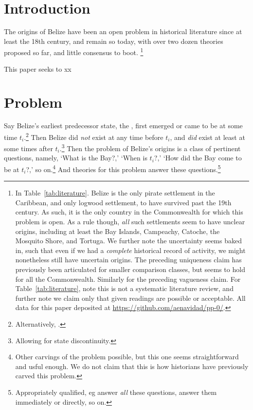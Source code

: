 
%
%
%
\section{Introduction}
\label{s:intro}
	The origins of Belize have been an open problem in historical literature since at least the 18th century, and remain so today, with over two dozen theories proposed so far, and little consensus to boot.%
	\footnote{In Table~\ref{tab:literature}. Belize is the only pirate settlement in the Caribbean, and only logwood settlement, to have survived past the 19th century. As such, it is the only country in the Commonwealth for which this problem is open. As a rule though, \emph{all} such settlements seem to have unclear origins, including at least the Bay Islands, Campeachy, Catoche, the Mosquito Shore, and Tortuga. We further note the uncertainty seems baked in, such that even if we had a \emph{complete} historical record of activity, we might nonetheless still have uncertain origins. The preceding uniqueness claim has previously been articulated for smaller comparison classes, but seems to hold for all the Commonwealth. Similarly for the preceding vagueness claim. For Table~\ref{tab:literature}, note this is not a systematic literature review, and further note we claim only that given readings are possible or acceptable. All data for this paper deposited at \url{https://github.com/aenavidad/pp-0/}.}
	
	This paper seeks to xx
%
%
%
\section{Problem}
\label{s:problem}
	Say Belize's earliest predecessor state, the , first emerged or came to be at some time \(t_i\).\footnote{Alternatively, .} Then Belize did \emph{not} exist at any time before \(t_i\), and \emph{did} exist at least at some times after \(t_i\).\footnote{Allowing for state discontinuity.} Then the problem of Belize's origins is a class of pertinent questions, namely, `What is the Bay?,' `When is \(t_i\)?,' `How did the Bay come to be at \(t_i\)?,' so on.\footnote{Other carvings of the problem possible, but this one seems straightforward and usful enough. We do not claim that this is how historians have previously carved this problem.} And theories for this problem answer these questions.\footnote{Appropriately qualified, eg answer \emph{all} these questions, answer them immediately or directly, so on.}
	
